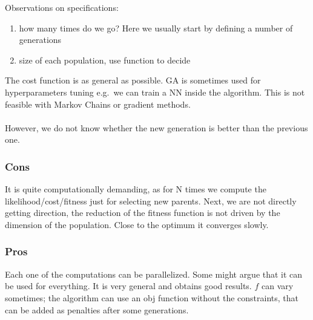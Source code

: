 \noindent
Observations on specifications:

\begin{enumerate}
\def\labelenumi{\arabic{enumi}.}
\tightlist
\item
  how many times do we go? Here we usually start by defining a number of
  generations
\item
  size of each population, use function to decide
\end{enumerate}

The cost function is as general as possible. GA is sometimes used for
hyperparameters tuning e.g.~we can train a NN inside the algorithm. This
is not feasible with Markov Chains or gradient methods.
\\
\\
\noindent
However, we do not know whether the new generation is better than the
previous one.

\subsubsection{Cons}

It is quite computationally demanding, as for N times we compute the
likelihood/cost/fitness just for selecting new parents. Next, we are not
directly getting direction, the reduction of the fitness function is not
driven by the dimension of the population. Close to the optimum it
converges slowly.

\subsubsection{Pros}

Each one of the computations can be parallelized. Some might argue that
it can be used for everything. It is very general and obtains good
results. \(f\) can vary sometimes; the algorithm can use an obj function
without the constraints, that can be added as penalties after some
generations.

